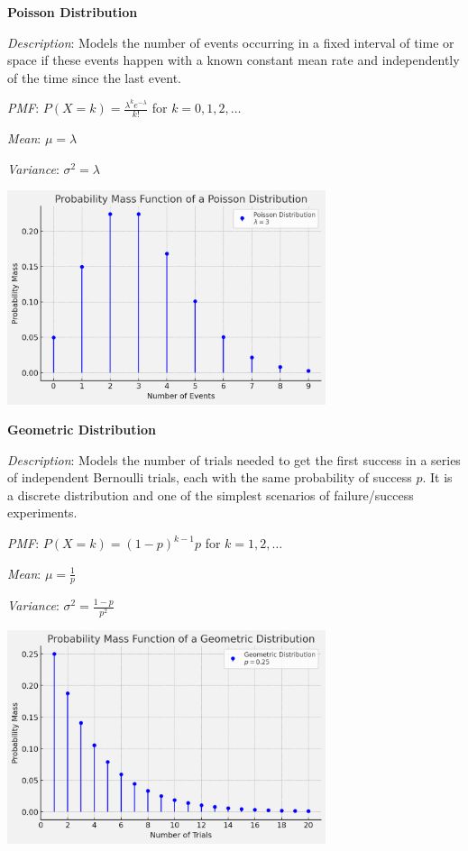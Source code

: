 \documentclass{article}
\begin{document}
\begin{multicols}{2}
\begin{mdframed}
\end{mdframed}
\begin{mdframed}
  \textbf{Poisson Distribution}
  
  \textit{Description}: Models the number of events occurring in a fixed interval of time or space if these events happen with a known constant mean rate and independently of the time since the last event.
  
  \textit{PMF}: $P(X=k) = \frac{\lambda^k e^{-\lambda}}{k!}$ for $k = 0, 1, 2, \ldots$
  
  \textit{Mean}: $\mu = \lambda$
  
  \textit{Variance}: $\sigma^2 = \lambda$
  
  \begin{center}
    \includegraphics*[width=0.7\textwidth]{poisson.png}
  \end{center}
  
\end{mdframed}
\begin{mdframed}
  \textbf{Geometric Distribution}
  
  \textit{Description}: Models the number of trials needed to get the first success in a series of independent Bernoulli trials, each with the same probability of success $p$. It is a discrete distribution and one of the simplest scenarios of failure/success experiments.
  
  \textit{PMF}: $P(X=k) = (1-p)^{k-1}p$ for $k = 1, 2, \ldots$
  
  \textit{Mean}: $\mu = \frac{1}{p}$
  
  \textit{Variance}: $\sigma^2 = \frac{1-p}{p^2}$
  
  \begin{center}
    \includegraphics*[width=0.7\textwidth]{geometric.png}
  \end{center}
  
\end{mdframed}
  
\end{multicols}
\end{document}
